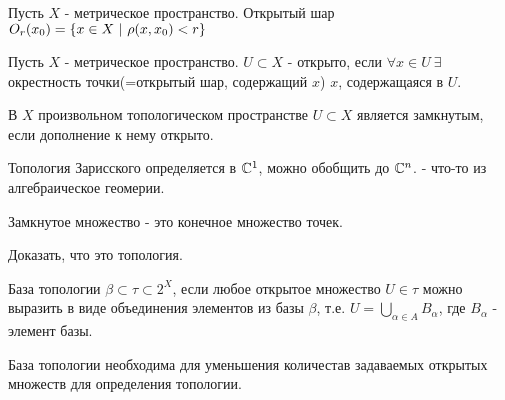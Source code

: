 \begin{definition}
    Пусть $X$ - метрическое пространство. Открытый шар $O_r (x_0) = \left\{x \in X \ | \ \rho(x, x_0) < r\right\}$
\end{definition}

\begin{definition}
    Пусть $X$ - метрическое пространство. $U \subset X$ - открыто, если $\forall x \in U \ \exists$ окрестность точки(=открытый шар, содержащий $x$) $x$, содержащаяся в $U$. 
\end{definition}

\begin{definition}
    В $X$ произвольном топологическом пространстве $U \subset X$ является замкнутым, если дополнение к нему открыто.
\end{definition}

\begin{example}
    Топология Зарисского определяется в $\mathbb{C}^1$, можно обобщить до $\mathbb{C}^n$. - что-то из алгебраическое геомерии.

    Замкнутое множество - это конечное множество точек.
\end{example}
\begin{exercise}
    Доказать, что это топология.
\end{exercise}

\begin{definition}
    База топологии $\beta \subset \tau \subset 2^X$, если любое открытое множество $U \in \tau$ можно выразить в виде объединения элементов из базы $\beta$, т.е. $U = \bigcup_{\alpha \in A} B_{\alpha}$, где $B_{\alpha}$ - элемент базы.
\end{definition}

База топологии необходима для уменьшения количестав задаваемых открытых множеств для определения топологии.

